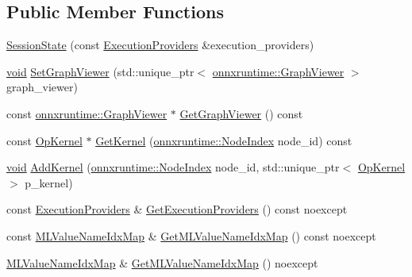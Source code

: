 \subsection*{Public Member Functions}
\begin{DoxyCompactItemize}
\item 
\mbox{\hyperlink{classonnxruntime_1_1SessionState_a205e81db480190a6094007f4076968e7}{Session\+State}} (const \mbox{\hyperlink{classonnxruntime_1_1ExecutionProviders}{Execution\+Providers}} \&execution\+\_\+providers)
\item 
\mbox{\hyperlink{mlasi_8h_a88f941d423cb2a819b70a1358982b1a6}{void}} \mbox{\hyperlink{classonnxruntime_1_1SessionState_a82b05bf5a5bfff13a32242a3f70eed67}{Set\+Graph\+Viewer}} (std\+::unique\+\_\+ptr$<$ \mbox{\hyperlink{classonnxruntime_1_1GraphViewer}{onnxruntime\+::\+Graph\+Viewer}} $>$ graph\+\_\+viewer)
\item 
const \mbox{\hyperlink{classonnxruntime_1_1GraphViewer}{onnxruntime\+::\+Graph\+Viewer}} $\ast$ \mbox{\hyperlink{classonnxruntime_1_1SessionState_a20ed31bc58745fe97790032469f63e70}{Get\+Graph\+Viewer}} () const
\item 
const \mbox{\hyperlink{classonnxruntime_1_1OpKernel}{Op\+Kernel}} $\ast$ \mbox{\hyperlink{classonnxruntime_1_1SessionState_a55c1f861930fdd86c669b86a687188aa}{Get\+Kernel}} (\mbox{\hyperlink{namespaceonnxruntime_af8773b5c12b5d8fd9292eb2e268df760}{onnxruntime\+::\+Node\+Index}} node\+\_\+id) const
\item 
\mbox{\hyperlink{mlasi_8h_a88f941d423cb2a819b70a1358982b1a6}{void}} \mbox{\hyperlink{classonnxruntime_1_1SessionState_aece5e3d91251079cc29d5047b641038f}{Add\+Kernel}} (\mbox{\hyperlink{namespaceonnxruntime_af8773b5c12b5d8fd9292eb2e268df760}{onnxruntime\+::\+Node\+Index}} node\+\_\+id, std\+::unique\+\_\+ptr$<$ \mbox{\hyperlink{classonnxruntime_1_1OpKernel}{Op\+Kernel}} $>$ p\+\_\+kernel)
\item 
const \mbox{\hyperlink{classonnxruntime_1_1ExecutionProviders}{Execution\+Providers}} \& \mbox{\hyperlink{classonnxruntime_1_1SessionState_a5be9a9ca5514bb5348e767decba4adad}{Get\+Execution\+Providers}} () const noexcept
\item 
const \mbox{\hyperlink{classonnxruntime_1_1MLValueNameIdxMap}{M\+L\+Value\+Name\+Idx\+Map}} \& \mbox{\hyperlink{classonnxruntime_1_1SessionState_a0116cd101cba999d0795511cde756db9}{Get\+M\+L\+Value\+Name\+Idx\+Map}} () const noexcept
\item 
\mbox{\hyperlink{classonnxruntime_1_1MLValueNameIdxMap}{M\+L\+Value\+Name\+Idx\+Map}} \& \mbox{\hyperlink{classonnxruntime_1_1SessionState_a2305627caea42ef2051aeb3c52b99de3}{Get\+M\+L\+Value\+Name\+Idx\+Map}} () noexcept

\end{DoxyCompactItemize}
